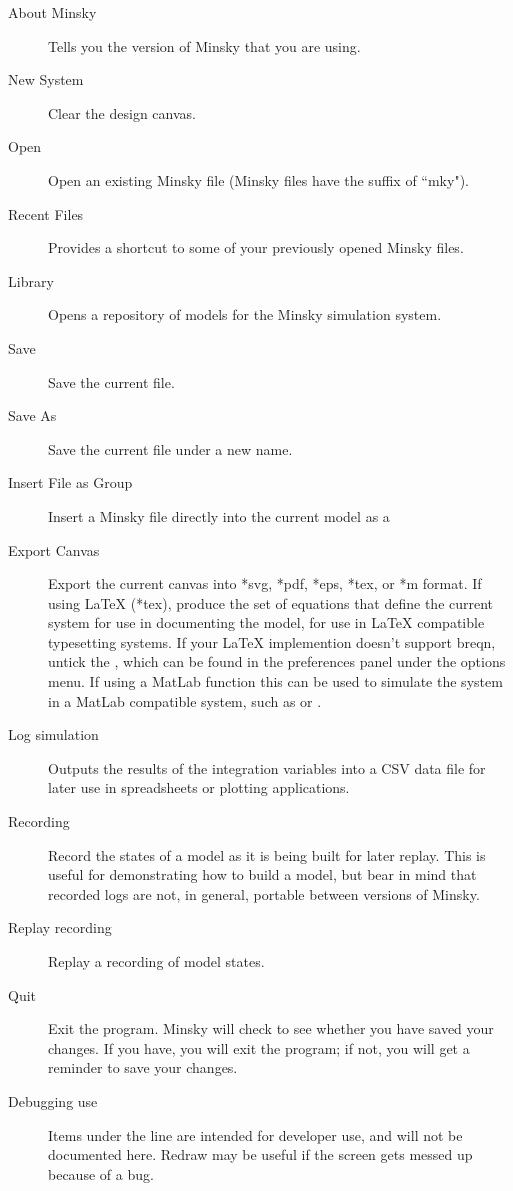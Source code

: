 \label{File}
\begin{description}
\item [{About Minsky}] Tells you the version of Minsky that you are using.
\item [{New System}] Clear the design canvas.
\item [{Open}] Open an existing Minsky file (Minsky files have the suffix
of ``mky").
\item [{Recent Files}] \label{recentfiles} Provides a shortcut to some
of your previously opened Minsky files.
\item [{Library}] Opens a repository of models for the Minsky simulation
system.
\item [{Save}] Save the current file.
\item [{Save As}] Save the current file under a new name.
\item [{Insert File as Group}] Insert a Minsky file directly into the
current model as a 
\item [{Export Canvas}] Export the current canvas into {*}svg, {*}pdf,
{*}eps, {*}tex, or {*}m format. If using LaTeX ({*}tex), produce the
set of equations that define the current system for use in documenting
the model, for use in LaTeX compatible typesetting systems. If your
LaTeX implemention doesn't support breqn, untick the , which can be found in the
preferences panel under the options menu. If using a MatLab function
this can be used to simulate the system in a MatLab compatible system,
such as 
or .
\item [{Log simulation}] Outputs the results of the integration variables
into a CSV data file for later use in spreadsheets or plotting applications.
\item [{Recording}] Record the states of a model as it is being built for
later replay. This is useful for demonstrating how to build a model,
but bear in mind that recorded logs are not, in general, portable
between versions of Minsky.
\item [{Replay recording}] Replay a recording of model states.
\item [{Quit}] Exit the program. Minsky will check to see whether you have
saved your changes. If you have, you will exit the program; if not,
you will get a reminder to save your changes.
\item [{Debugging use}] Items under the line are intended for developer
use, and will not be documented here. Redraw may be useful if the
screen gets messed up because of a bug.
\end{description}

